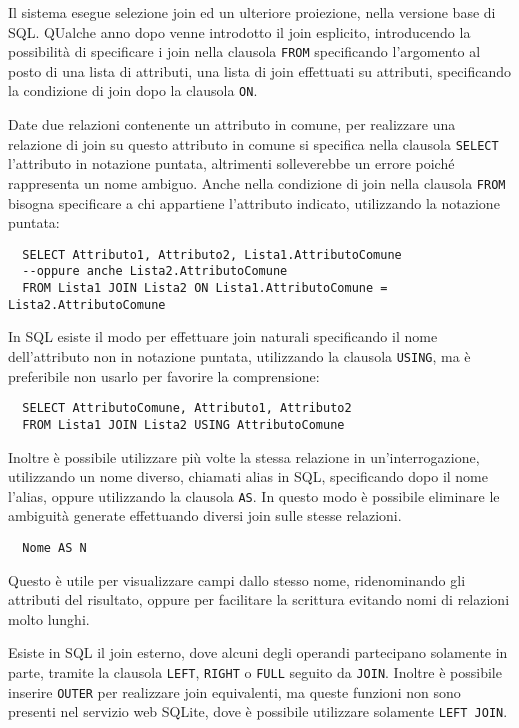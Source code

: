 \documentclass{article}
\numberwithin{equation}{subsection}
\begin{document}
Il sistema esegue selezione join ed un ulteriore proiezione, nella versione base di SQL. QUalche anno dopo venne introdotto il join esplicito, 
introducendo la possibilità di specificare i join nella clausola \verb|FROM| specificando l'argomento al posto di una lista di attributi, una lista 
di join effettuati su attributi, specificando la condizione di join dopo la clausola \verb|ON|. 

Date due relazioni contenente un attributo in comune, per realizzare una relazione di join su questo attributo in comune si specifica nella 
clausola \verb|SELECT| l'attributo in notazione puntata, altrimenti solleverebbe un errore poiché rappresenta un nome ambiguo. Anche nella 
condizione di join nella clausola \verb|FROM| bisogna specificare a chi appartiene l'attributo indicato, utilizzando la notazione puntata: 

\begin{verbatim}
  SELECT Attributo1, Attributo2, Lista1.AttributoComune 
  --oppure anche Lista2.AttributoComune
  FROM Lista1 JOIN Lista2 ON Lista1.AttributoComune = Lista2.AttributoComune
\end{verbatim}

In SQL esiste il modo per effettuare join naturali specificando il nome dell'attributo non in notazione puntata, utilizzando la clausola \verb|USING|, 
ma è preferibile non usarlo per favorire la comprensione:

\begin{verbatim}
  SELECT AttributoComune, Attributo1, Attributo2
  FROM Lista1 JOIN Lista2 USING AttributoComune
\end{verbatim}

Inoltre è possibile utilizzare più volte la stessa relazione in un'interrogazione, utilizzando un nome diverso, chiamati alias in SQL, specificando dopo il nome 
l'alias, oppure utilizzando la clausola \verb|AS|. In questo modo è possibile eliminare le ambiguità generate effettuando diversi join sulle stesse relazioni. 
\begin{verbatim}
  Nome AS N
\end{verbatim}

Questo è utile per visualizzare campi dallo stesso nome, ridenominando gli attributi del risultato, oppure per facilitare la scrittura 
evitando nomi di relazioni molto lunghi. 

Esiste in SQL il join esterno, dove alcuni degli operandi partecipano solamente in parte, tramite la clausola \verb|LEFT|, \verb|RIGHT| o \verb|FULL| 
seguito da \verb|JOIN|. Inoltre è possibile inserire \verb|OUTER| per realizzare join equivalenti, ma queste funzioni non sono presenti nel servizio web SQLite, dove 
è possibile utilizzare solamente \verb|LEFT JOIN|. 
\end{document}
